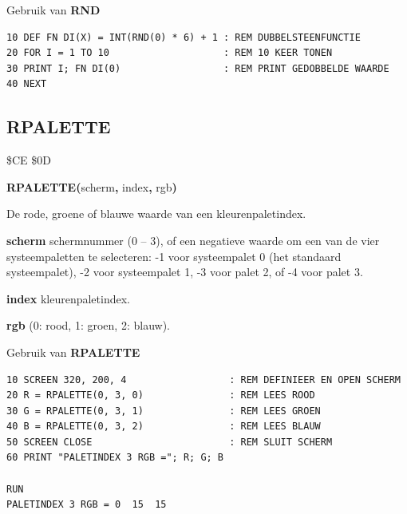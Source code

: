 \begin{description}[leftmargin=2cm,style=nextline]
\item [Voorbeeld:]  Gebruik van {\bf RND}

\begin{tcolorbox}[colback=black,coltext=white]
\verbatimfont{\codefont}
\begin{verbatim}
10 DEF FN DI(X) = INT(RND(0) * 6) + 1 : REM DUBBELSTEENFUNCTIE
20 FOR I = 1 TO 10                    : REM 10 KEER TONEN
30 PRINT I; FN DI(0)                  : REM PRINT GEDOBBELDE WAARDE
40 NEXT
\end{verbatim}
\end{tcolorbox}
\end{description}


\newpage
\subsection{RPALETTE}
\begin{description}[leftmargin=2cm,style=nextline]
\item [Token:]    \$CE \$0D

\item [Formaat:]   {\bf RPALETTE(}scherm{\bf,} index{\bf,} rgb{\bf)}

\item [Retourneert:]  De rode, groene of blauwe waarde van een kleurenpaletindex.

{\bf scherm} schermnummer (0 -- 3), of een negatieve waarde om een van de vier systeempaletten te selecteren: -1 voor systeempalet 0 (het standaard systeempalet), -2 voor systeempalet 1, -3 voor palet 2, of -4 voor palet 3.

                  {\bf index} kleurenpaletindex.

                  {\bf rgb} (0: rood, 1: groen, 2: blauw).

\item [Voorbeeld:]  Gebruik van {\bf RPALETTE}

\begin{tcolorbox}[colback=black,coltext=white]
\verbatimfont{\codefont}
\begin{verbatim}
10 SCREEN 320, 200, 4                  : REM DEFINIEER EN OPEN SCHERM
20 R = RPALETTE(0, 3, 0)               : REM LEES ROOD
30 G = RPALETTE(0, 3, 1)               : REM LEES GROEN
40 B = RPALETTE(0, 3, 2)               : REM LEES BLAUW
50 SCREEN CLOSE                        : REM SLUIT SCHERM
60 PRINT "PALETINDEX 3 RGB ="; R; G; B

RUN
PALETINDEX 3 RGB = 0  15  15
\end{verbatim}
\end{tcolorbox}
\end{description}

